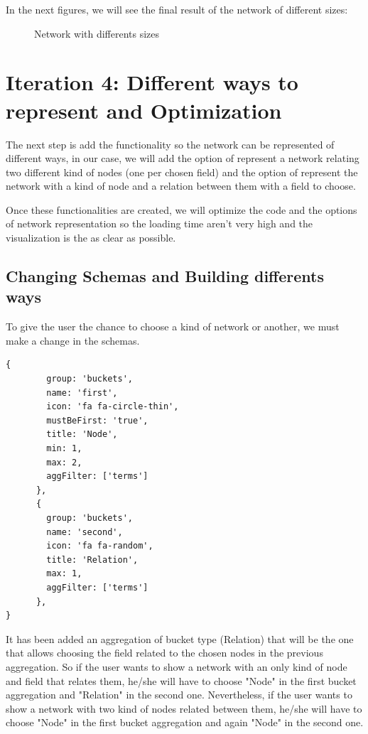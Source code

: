 \documentclass[a4paper, 12pt]{book}
\begin{document}
In the next figures, we will see the final result of the network of different sizes:

\begin{figure}[H]
 \centering
 \caption{Network with differents sizes}
 \label{f:sigmaexamples}
\end{figure}



\section{Iteration 4: Different ways to represent and Optimization}

The next step is add the functionality so the network can be represented of different ways, in our case, we will add the option of represent a network relating two different kind of nodes (one per chosen field) and the option of represent the network with a kind of node and a relation between them with a field to choose.

Once these functionalities are created, we will optimize the code and the options of network representation so the loading time aren’t very high and the visualization is the as clear as possible.

\subsection{Changing Schemas and Building differents ways}

To give the user the chance to choose a kind of network or another, we must make a change in the schemas.

\begin{lstlisting}[frame=single]
{
        group: 'buckets',
        name: 'first',
        icon: 'fa fa-circle-thin',
        mustBeFirst: 'true',
        title: 'Node',
        min: 1,
        max: 2,
        aggFilter: ['terms']
      },
      {
        group: 'buckets',
        name: 'second',
        icon: 'fa fa-random',
        title: 'Relation',
        max: 1,
        aggFilter: ['terms']
      },
}
\end{lstlisting}

It has been added an aggregation of bucket type (Relation) that will be the one that allows choosing the field related to the chosen nodes in the previous aggregation. So if the user wants to show a network with an only kind of node and field that relates them, he/she will have to choose "Node" in the first bucket aggregation and "Relation" in the second one. Nevertheless, if the user wants to show a network with two kind of nodes related between them, he/she will have to choose "Node" in the first bucket aggregation and again "Node" in the second one.
 
\end{document}
